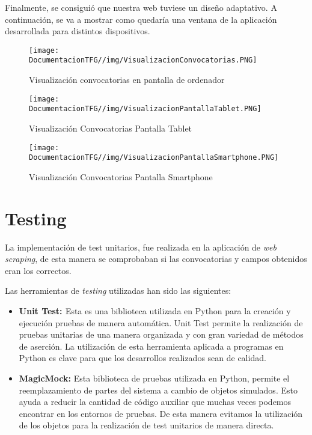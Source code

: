 Finalmente, se consiguió que nuestra web tuviese un diseño adaptativo. A continuación, se va a mostrar como quedaría una ventana de la aplicación desarrollada para distintos dispositivos.

\begin{figure}[H]
    \centering
    \texttt{[image: DocumentacionTFG//img/VisualizacionConvocatorias.PNG]}
    \caption{Visualización convocatorias en pantalla de ordenador}
\end{figure}

\begin{figure}[H]
    \centering
    \texttt{[image: DocumentacionTFG//img/VisualizacionPantallaTablet.PNG]}
    \caption{Visualización Convocatorias Pantalla Tablet}
\end{figure}

\begin{figure}[H]
    \centering
    \texttt{[image: DocumentacionTFG//img/VisualizacionPantallaSmartphone.PNG]}
    \caption{Visualización Convocatorias Pantalla Smartphone}
\end{figure}

\section{Testing}
La implementación de test unitarios, fue realizada en la aplicación de \textit{web scraping}, de esta manera se comprobaban si las convocatorias y campos obtenidos eran los correctos.

Las herramientas de \textit{testing} utilizadas han sido las siguientes:

\begin{itemize}
    \item \textbf{Unit Test: \cite{unittest:latex}} Esta es una biblioteca utilizada en Python para la creación y ejecución pruebas de manera automática. Unit Test permite la realización de pruebas unitarias de una manera organizada y con gran variedad de métodos de aserción. La utilización de esta herramienta aplicada a programas en Python es clave para que los desarrollos realizados sean de calidad.
    \item \textbf{MagicMock:} Esta biblioteca de pruebas utilizada en Python, permite el reemplazamiento de partes del sistema a cambio de objetos simulados. Esto ayuda a reducir la cantidad de código auxiliar que muchas veces podemos encontrar en los entornos de pruebas. De esta manera evitamos la utilización de los objetos para la realización de test unitarios de manera directa.
\end{itemize}



